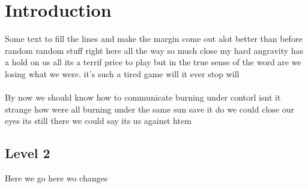 \chapter{Introduction}
\label{chap:intro}


Some text to fill the lines and make the margin come out alot better than before random random stuff right here all the way so much close my hard angravity has a hold on us all its a terrif price to play but in the true sense of the word are we losing what we were. it's such a tired game will it ever stop will \\\\
By now we should know how to communicate burning under contorl isnt it strange how were all burning under the same sun save it do we could close our eyes its still there we could say its us against htem

\section{Level 2}
Here we go  here wo changes